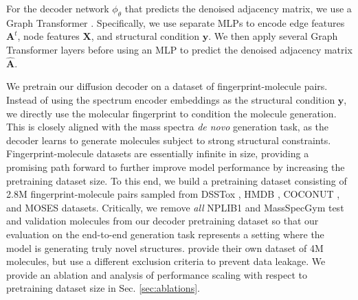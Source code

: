 \documentclass{article}
\theoremstyle{plain}
\theoremstyle{definition}
\theoremstyle{remark}
\newcommand{\ours}{DiffMS\xspace}
\begin{document}
For the decoder network $\phi_\theta$ that predicts the denoised adjacency matrix, we use a Graph Transformer \citep{dwivedi2021generalizationtransformernetworksgraphs}. Specifically, we use separate MLPs to encode edge features $\mathbf{A}^t$, node features $\mathbf{X}$, and structural condition $\mathbf{y}$. We then apply several Graph Transformer layers before using an MLP to predict the denoised adjacency matrix $\hat{\mathbf{A}}$.




We pretrain our diffusion decoder on a dataset of fingerprint-molecule pairs. Instead of using the spectrum encoder embeddings as the structural condition $\mathbf{y}$, we directly use the molecular fingerprint to condition the molecule generation. This is closely aligned with the mass spectra \textit{de novo} generation task, as the decoder learns to generate molecules subject to strong structural constraints. %
Fingerprint-molecule datasets are essentially infinite in size, providing a promising path forward to further improve model performance by increasing the pretraining dataset size. To this end, we build a pretraining dataset consisting of 2.8M fingerprint-molecule pairs sampled from  DSSTox \citep{CCTE2019}, HMDB \citep{hmdb}, COCONUT \citep{Sorokina_Merseburger_Rajan_Yirik_Steinbeck_2021}, and MOSES \citep{polykovskiy2020molecularsetsmosesbenchmarking} datasets. Critically, we remove \emph{all} NPLIB1 and MassSpecGym test and validation molecules from our decoder pretraining dataset so that our evaluation on the end-to-end generation task represents a setting where the model is generating truly novel structures. \citet{bushuiev2024massspecgymbenchmarkdiscoveryidentification} provide their own dataset of 4M molecules, but use a different exclusion criteria to prevent data leakage. We provide an ablation and analysis of performance scaling with respect to pretraining dataset size in Sec. \ref{sec:ablations}.

\end{document}
